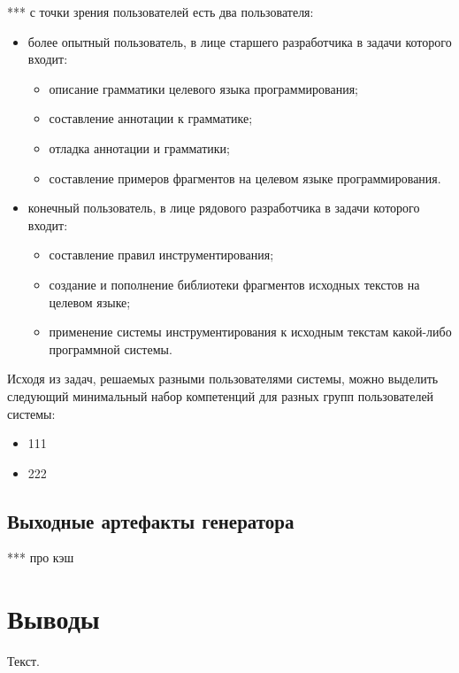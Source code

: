 ***
с точки зрения пользователей есть два пользователя:

\begin{itemize}
  \item более опытный пользователь, в лице старшего разработчика в задачи которого входит:
    \begin{itemize}
      \item описание грамматики целевого языка программирования;
      \item составление аннотации к грамматике;
      \item отладка аннотации и грамматики;
      \item составление примеров фрагментов на целевом языке программирования.
    \end{itemize}

  \item конечный пользователь, в лице рядового разработчика в задачи которого входит:
    \begin{itemize}
      \item составление правил инструментирования;
      \item создание и пополнение библиотеки фрагментов исходных текстов на целевом языке;
      \item применение системы инструментирования к исходным текстам какой-либо программной системы.
    \end{itemize}
\end{itemize}

Исходя из задач, решаемых разными пользователями системы, можно выделить следующий минимальный набор компетенций для разных групп пользователей системы:
\begin{itemize}
  \item 111
  \item 222
\end{itemize}


\subsection{Выходные артефакты генератора}

***
про кэш

\section{Выводы}

Текст.

